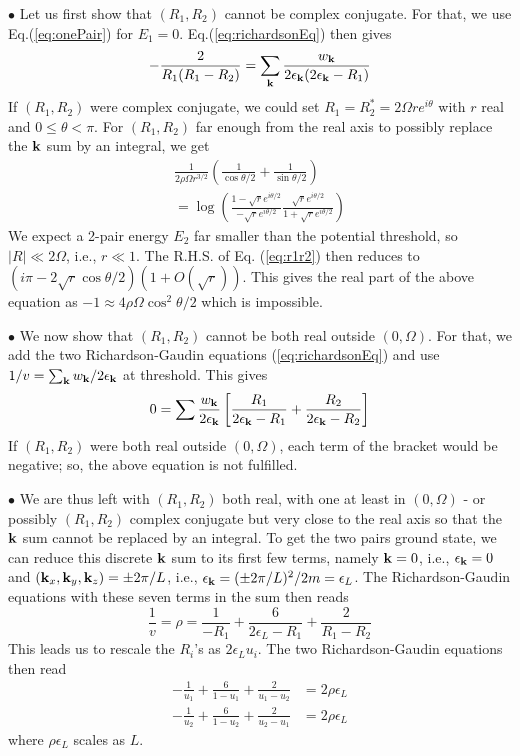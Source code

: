 \documentclass[5p,twocolumn]{elsarticle}
\begin{document}
$\bullet$ Let us first show that $(R_1,R_2)$ cannot be complex conjugate. For that, we use Eq.(\ref{eq:onePair}) for $E_1=0$. Eq.(\ref{eq:richardsonEq}) then gives
\begin{equation}
-\frac{2}{R_{1}(R_{1}-R_{2})}=\sum_{\mathbf{k}}\frac{w_{\mathbf{k}}}{2\epsilon_{\mathbf{k}}(2\epsilon_{\mathbf{k}}-R_{1})}
\end{equation}
If $(R_1,R_2)$ were complex conjugate, we could set $R_1=R^*_2=2 \Omega r e^{i\theta}$ with $r$ real and $0\leqslant\theta<\pi$. For $(R_1,R_2)$ far enough from the real axis to possibly replace the $\mathbf{k}$ sum by an integral, we get
\begin{multline}\label{eq:r1r2}
\frac{1}{2\rho\Omega{r^{3/2}}}\left(\frac{1}{\cos\theta/2}+\frac{1}{\sin\theta/2}\right)\\
=\log\left(\frac{1-\sqrt{r}e^{i\theta/2}}{-\sqrt{r}e^{i\theta/2}}\frac{\sqrt{r}e^{i\theta/2}}{1+\sqrt{r}e^{i\theta/2}}\right)
\end{multline}
We expect a 2-pair energy $E_{2}$ far smaller than the potential threshold, so $|R|\ll2 \Omega$, i.e., $r\ll1$. The R.H.S. of Eq. (\ref{eq:r1r2}) then reduces to 
$(i\pi-2\sqrt r\cos\theta/2)(1+O(\sqrt r))$. This gives the real part of the above equation as $-1\approx4 \rho \Omega\cos^2\theta/2$ which is impossible.


$\bullet$ We now show that $(R_1,R_2)$ cannot be both real outside $(0,\Omega)$. For that, we add the two Richardson-Gaudin equations (\ref{eq:richardsonEq}) and use $1/v=\sum_{\mathbf{k}}w_{\mathbf{k}}/2\epsilon_{\mathbf{k}}$ at threshold. This gives
\begin{equation}
0=\sum\frac{w_{\mathbf{k}}}{2\epsilon_{\mathbf{k}}}\left[\frac{R_{1}}{2\epsilon_{\mathbf{k}}-R_{1}}+\frac{R_{2}}{2\epsilon_{\mathbf{k}}-R_{2}}\right]
\end{equation}
If $(R_1,R_2)$ were both real outside $(0,\Omega)$, each term of the bracket would be negative; so, the above equation is not fulfilled.


$\bullet$ We are thus left with $(R_1,R_2)$ both real, with one at least in $(0,\Omega)$ - or possibly $(R_1,R_2)$ complex conjugate but very close to the real axis so that the $\mathbf{k}$ sum cannot be replaced by an integral. To get the two pairs ground state, we can reduce this discrete $\mathbf{k}$ sum to its first few terms, namely $\mathbf{k}=0$, i.e., $\epsilon_{\mathbf{k}}=0$ and
 $(\mathbf{k}_x,\mathbf{k}_y,\mathbf{k}_z)=\pm 2\pi/L
 $, i.e., $\epsilon_{\mathbf{k}}=(\pm 2\pi/L)^2/2m=\epsilon_L$. The Richardson-Gaudin equations with these seven terms in the sum then reads
\begin{equation}
\frac{1}{v}=\rho=\frac{1}{-R_{1}}+\frac{6}{2\epsilon_{L}-R_{1}}+\frac{2}{R_{1}-R_{2}}
\end{equation}
This leads us to rescale the $R_i$'s as $2\epsilon_L u_i$. The two Richardson-Gaudin equations then read
\begin{equation}
\begin{split}
-\frac{1}{u_{1}}+\frac{6}{1-u_{1}}+\frac{2}{u_{1}-u_{2}}&=2\rho\epsilon_{L}\\
-\frac{1}{u_{2}}+\frac{6}{1-u_{2}}+\frac{2}{u_{2}-u_{1}}&=2\rho\epsilon_{L}
\end{split}\label{eq:t12}
\end{equation}
where $\rho\epsilon_L$ scales as $L$.
\end{document}
